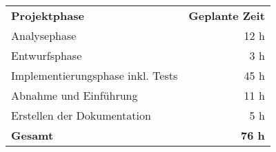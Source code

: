 \begin{tabular}{lr}
\rowcolor{heading}\textbf{Projektphase} & \textbf{Geplante Zeit} \\
Analysephase & 12 h \\
\rowcolor{odd}Entwurfsphase & 3 h \\
Implementierungsphase inkl. Tests & 45 h \\
\rowcolor{odd}Abnahme und Einführung & 11 h \\
Erstellen der Dokumentation & 5 h \\
\hline
\hline
\rowcolor{odd}\textbf{Gesamt} & \textbf{76 h} \\
\end{tabular}

